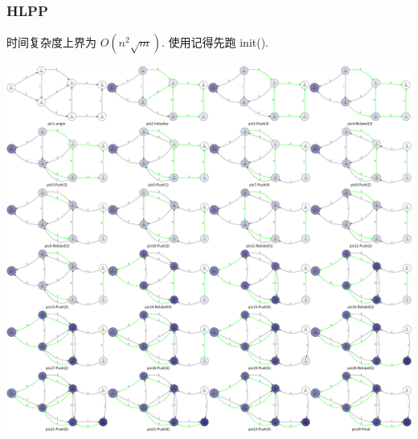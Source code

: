 \documentclass[UTF8, a4paper, titlepage, twoside]{ctexart}
\begin{document}
\subsubsection{ HLPP }
时间复杂度上界为 $O(n^2 \sqrt{m})$.
使用记得先跑 init().
\begin{center}
	\includegraphics[width=14cm]{hhlp.png}
\end{center}
\end{document}
